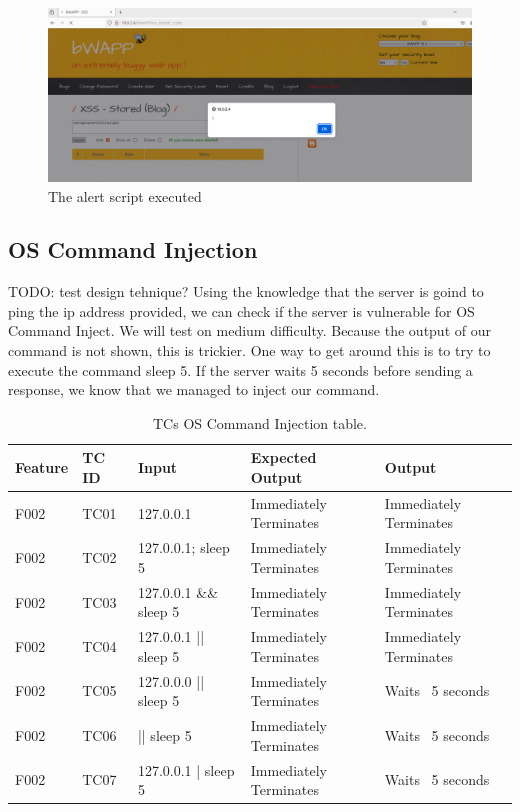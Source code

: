 \documentclass{article}
\begin{document}
\begin{figure}
    \centering
    \includegraphics[width=1\linewidth]{Figures/beef/xss-alert.png}
    \caption{\label{fig:xss-alert}The alert script executed}
\end{figure}



\subsection{OS Command Injection}
TODO: test design tehnique?
Using the knowledge that the server is goind to ping the ip address provided, we can check if the server is vulnerable for OS Command Inject.
We will test on medium difficulty.
Because the output of our command is not shown, this is trickier. One way to get around this is to try to execute the command sleep 5.
If the server waits 5 seconds before sending a response, we know that we managed to inject our command.

\begin{table} [htpb]
    \centering
    \begin{tabular}{l|l|l|l|l}
        Feature & TC ID & Input                  & Expected Output        & Output                 \\ \hline
        F002    & TC01  & 127.0.0.1              & Immediately Terminates & Immediately Terminates \\
        F002    & TC02  & 127.0.0.1; sleep 5     & Immediately Terminates & Immediately Terminates \\
        F002    & TC03  & 127.0.0.1 \&\& sleep 5 & Immediately Terminates & Immediately Terminates \\
        F002    & TC04  & 127.0.0.1 || sleep 5   & Immediately Terminates & Immediately Terminates \\
        F002    & TC05  & 127.0.0.0 || sleep 5   & Immediately Terminates & Waits ~5 seconds       \\
        F002    & TC06  & || sleep 5             & Immediately Terminates & Waits ~5 seconds       \\
        F002    & TC07  & 127.0.0.1 | sleep 5    & Immediately Terminates & Waits ~5 seconds       \\
    \end{tabular}
    \caption{\label{tab:TC-command-injection}TCs OS Command Injection table.}
\end{table}
\end{document}
